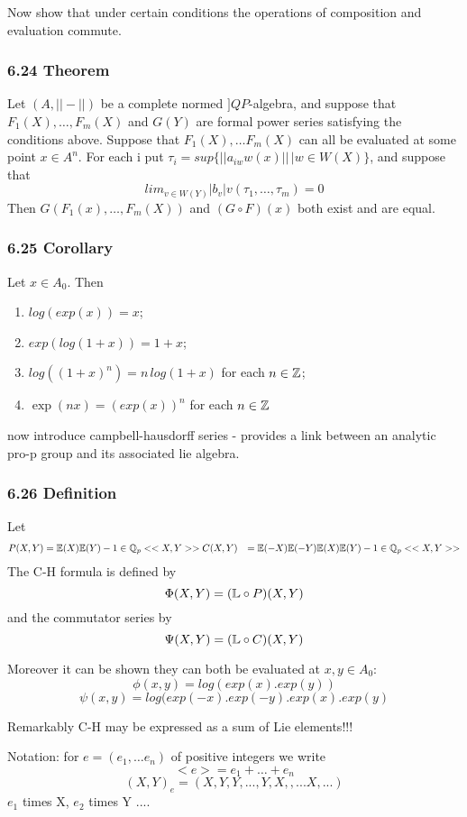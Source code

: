 Now show that under certain conditions the operations of composition and evaluation commute.
\subsubsection*{6.24 Theorem}
Let $(A,||-||)$ be a complete normed $]QP$-algebra, and suppose that $F_1(X),\dots , F_m(X)$ and $G(Y)$ are formal power series satisfying the conditions above. Suppose that $F_1(X),\dots F_m(X)$ can all be evaluated at some point $x\in A^n$. For each i put $\tau_i = sup\{||a_{iw}w(x)||\, |w\in W(X)\}$, and suppose that
$$lim_{v\in W(Y)} |b_v| v(\tau_1, \dots , \tau_m ) = 0$$
Then $G(F_1(x),\dots , F_m(X))$ and $(G\circ F)(x)$ both exist and are equal.

\subsubsection*{6.25 Corollary}
Let $x\in A_0$. Then
\begin{enumerate}
\item $log(exp(x)) = x$;
\item $exp(log(1+x)) = 1+x$;
\item $log((1+x)^n) = n\, log(1+x)$ for each $n\in \mathbb Z$;
\item $\exp(nx) = (exp(x))^n$ for each $n\in \mathbb Z$
\end{enumerate}

now introduce campbell-hausdorff series - provides a link between an analytic pro-p group and its associated lie algebra.

\subsubsection*{6.26 Definition}
Let
\begin{eqnarray}
\nonumber P(X,Y) &= \mathbb E(X) \mathbb E(Y) - 1 \in \mathbb Q_p<<X,Y>> 
\nonumber C(X,Y) &= \mathbb E(-X) \mathbb E(-Y) \mathbb E (X) \mathbb E (Y) -1 \in \mathbb Q_p<< X,Y>>
\end{eqnarray}
The C-H formula is defined by
$$\Phi(X,Y) = (\mathbb L\circ P)(X,Y)$$
and the commutator series by
$$\Psi(X,Y) = (\mathbb L \circ C)(X,Y)$$

Moreover it can be shown they can both be evaluated at $x,y\in A_0$:
$$\phi(x,y) = log(exp(x).exp(y))$$
$$\psi(x,y) = log(exp(-x) . exp(-y) . exp(x) . exp(y)$$

Remarkably C-H may be expressed as a sum of Lie elements!!!

Notation: for $e = (e_1,\dots e_n)$ of positive integers we write
$$<e> = e_1 + \dots +e_n$$
$$(X,Y)_e = (X, Y, Y, ... , Y, X, ,... X, ...)$$ $e_1$ times X, $e_2$ times Y ....


